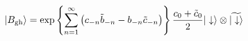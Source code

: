 \begin{equation}
 | B_{\rm gh} \rangle
 = \exp\left\{
        \sum_{n=1}^\infty
         \left(
         c_{-n} {\tilde b}_{-n} - b_{-n} {\tilde c}_{-n}
         \right)
       \right\}
    {{c_0+{\tilde c}_0} \over 2}
   | \downarrow \rangle \otimes \widetilde{ | \downarrow \rangle}
\end{equation}

